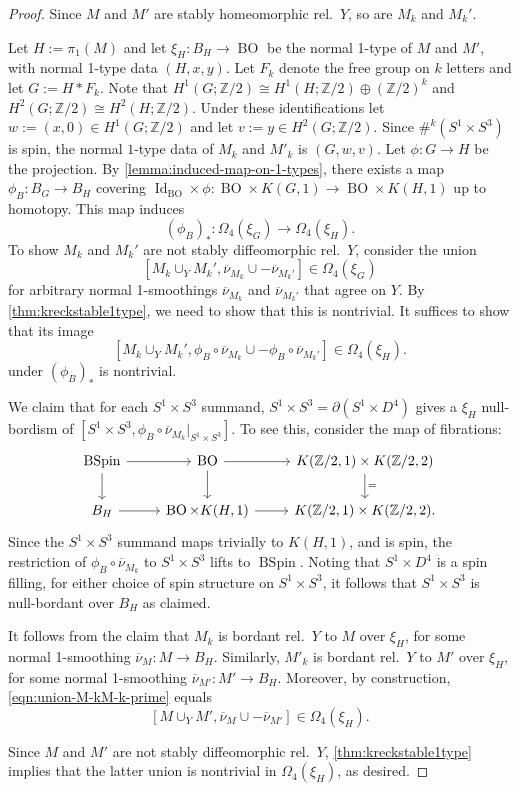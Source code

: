 \documentclass[a4paper, reqno]{amsart}
\theoremstyle{definition}
\theoremstyle{remark}
\newcommand{\Z}{\mathbb{Z}}
\newcommand{\Id}{\operatorname{Id}}
\newcommand{\ol}{\overline}
\DeclareMathOperator{\BSpin}{BSpin}
\DeclareMathOperator{\BO}{BO}
\begin{document}
\begin{proof}
Since $M$ and $M'$ are stably homeomorphic rel.\ $Y$, so are $M_k$ and $M_k'$.  
   
    Let $H:= \pi_1(M)$ and let $\xi_H \colon B_H \to \BO$ be the normal 1-type of $M$ and $M'$, with normal 1-type data $(H,x,y)$. Let $F_k$ denote the free group on $k$ letters and let $G := H *F_k$. 
Note that $H^1(G;\Z/2) \cong H^1(H;\Z/2) \oplus (\Z/2)^k$ and $H^2(G;\Z/2) \cong H^2(H;\Z/2)$. 
Under these identifications let $w:= (x,0) \in H^1(G;\Z/2)$ and let $v := y \in H^2(G;\Z/2)$.  Since $\#^k (S^1 \times S^3)$ is spin, the normal $1$-type data of $M_k$ and $M'_{k}$ is $(G,w,v)$.
Let $\phi \colon G \to H$ be the projection. By \cref{lemma:induced-map-on-1-types}, there exists a map $\phi_B\colon B_G\to B_H$ covering $\Id_{\BO}\times \phi\colon \BO\times K(G,1)\to\BO\times K(H,1)$ up to homotopy. This map induces
\[(\phi_{B})_* \colon \Omega_4(\xi_G) \to \Omega_4(\xi_H).\]
To show $M_k$ and $M_k'$ are not stably diffeomorphic rel.\ $Y$, consider the union 
\[[M_k \cup_Y M_k', \ol{\nu}_{M_k} \cup - \ol{\nu}_{M_k'}] \in \Omega_4(\xi_{G})
\]
for arbitrary normal 1-smoothings $\ol{\nu}_{M_k}$ and $\ol{\nu}_{M_k'}$ that agree on $Y$. By \cref{thm:kreckstable1type}, we need to show that this is nontrivial. 
It suffices to show that its image
\begin{equation}\label{eqn:union-M-kM-k-prime}
[M_k \cup_Y M_k', \phi_B\circ\ol{\nu}_{M_k} \cup - \phi_B\circ\ol{\nu}_{M_k'}] \in \Omega_4(\xi_{H}).
\end{equation}
under $(\phi_{B})_*$ is nontrivial.

We claim that for each $S^1 \times S^3$ summand,  $S^1 \times S^3 = \partial(S^1 \times D^4)$ gives a $\xi_H$ null-bordism of $[S^1\times S^3,\phi_B\circ\ol{\nu}_{M_k}|_{S^1 \times S^3}]$.
To see this, consider the map of fibrations:
\[\begin{tikzcd}
    \BSpin \ar[r] \ar[d] & \BO \ar[r] \ar[d]  & K(\Z/2,1) \times K(\Z/2,2) \ar[d,"="] \\
    B_H\ar[r]& \BO \times K(H,1) \ar[r]  & K(\Z/2,1) \times K(\Z/2,2).
\end{tikzcd}\]
Since the $S^1\times S^3$ summand maps trivially to $K(H,1)$, and is spin, the restriction of $\phi_B\circ\ol{\nu}_{M_k}$ to $S^1 \times S^3$ lifts to $\BSpin$. 
Noting that $S^1 \times D^4$ is a  spin filling, for either choice of spin structure on $S^1 \times S^3$, it follows that $S^1 \times S^3$ is null-bordant over $B_H$ as claimed. 

It follows from the claim that $M_k$ is bordant rel.\ $Y$ to $M$ over $\xi_H$, for some normal 1-smoothing $\ol{\nu}_M \colon M \to B_H$. Similarly, $M'_k$ is bordant rel.\ $Y$ to $M'$ over $\xi_H$, for some normal 1-smoothing $\ol{\nu}_{M'} \colon M' \to B_H$. Moreover, by construction, \eqref{eqn:union-M-kM-k-prime} equals \[[M \cup_Y M',\ol{\nu}_M \cup - \ol{\nu}_{M'}] \in \Omega_4(\xi_H).\]   

Since $M$ and $M'$ are not stably diffeomorphic rel.\ $Y$, \cref{thm:kreckstable1type} implies that the latter union is nontrivial in $\Omega_4(\xi_H)$, as desired. 
\end{proof}

\def\MR#1{}

\end{document}
